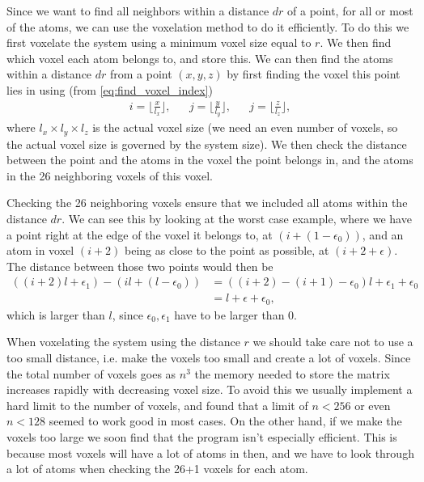Since we want to find all neighbors within a distance $dr$ of a point, for all or most of the atoms, we can use the voxelation method to do it efficiently. To do this we first voxelate the system using a minimum voxel size equal to $r$. We then find which voxel each atom belongs to, and store this. We can then find the atoms within a distance $dr$ from a point $(x,y,z)$ by first finding the voxel this point lies in using (from \cref{eq:find_voxel_index})
\begin{align*}
    &i = \Bigg\lfloor \frac{x}{l_x} \Bigg\rfloor,& &j = \Bigg\lfloor \frac{y}{l_y} \Bigg\rfloor,& &j = \Bigg\lfloor \frac{z}{l_z} \Bigg\rfloor,&
\end{align*}
where $l_x\times l_y \times l_z$ is the actual voxel size (we need an even number of voxels, so the actual voxel size is governed by the system size). We then check the distance between the point and the atoms in the voxel the point belongs in, and the atoms in the 26 neighboring voxels of this voxel. 
%

Checking the 26 neighboring voxels ensure that we included all atoms within the distance $dr$. We can see this by looking at the worst case example, where we have a point right at the edge of the voxel it belongs to, at $(i+(1-\epsilon_0))$, and an atom in voxel $(i+2)$ being as close to the point as possible, at $(i+2 + \epsilon)$. The distance between those two points would then be
\begin{align*}
    ((i+2)l + \epsilon_1) - (il + (l-\epsilon_0)) 
    &= ((i + 2) - (i + 1) - \epsilon_0)l + \epsilon_1 + \epsilon_0 \\
    &= l + \epsilon + \epsilon_0,
\end{align*}
which is larger than $l$, since $\epsilon_0, \epsilon_1$ have to be larger than 0.

When voxelating the system using the distance $r$ we should take care not to use a too small distance, i.e. make the voxels too small and create a lot of voxels. Since the total number of voxels goes as $n^3$ the memory needed to store the matrix increases rapidly with decreasing voxel size. To avoid this we usually implement a hard limit to the number of voxels, and found that a limit of $n < 256$ or even $n < 128$ seemed to work good in most cases. On the other hand, if we make the voxels too large we soon find that the program isn't especially efficient. This is because most voxels will have a lot of atoms in then, and we have to look through a lot of atoms when checking the 26+1 voxels for each atom.

